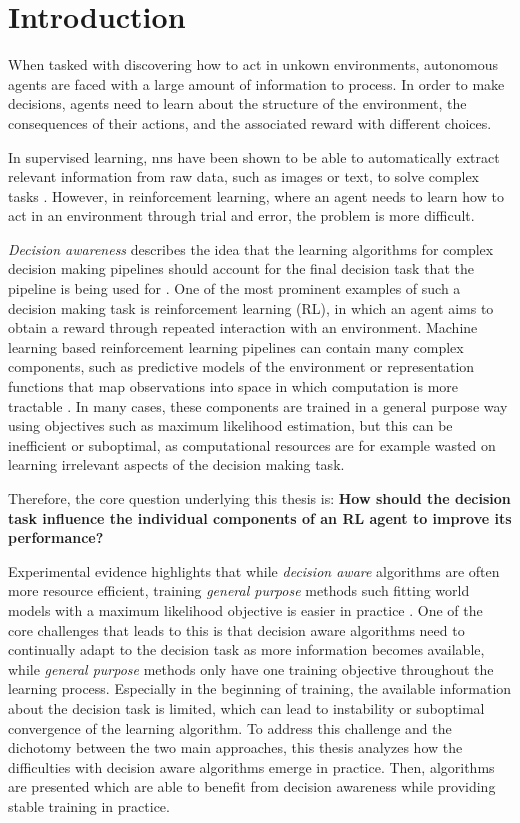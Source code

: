 \chapter{Introduction}

When tasked with discovering how to act in unkown environments, autonomous agents are faced with a large amount of information to process.
In order to make decisions, agents need to learn about the structure of the environment, the consequences of their actions, and the associated reward with different choices.

In supervised learning, \acp{nn} have been shown to be able to automatically extract relevant information from raw data, such as images or text, to solve complex tasks \parencite{lecun2015deep}.
However, in reinforcement learning, where an agent needs to learn how to act in an environment through trial and error, the problem is more difficult.


\emph{Decision awareness} describes the idea that the learning algorithms for complex decision making pipelines should account for the final decision task that the pipeline is being used for \parencite{vaml,grimm2020value,abachi2020policy,nikishin2021control}.
One of the most prominent examples of such a decision making task is reinforcement learning (RL), in which an agent aims to obtain a reward through repeated interaction with an environment.
Machine learning based reinforcement learning pipelines can contain many complex components, such as predictive models of the environment \parencite{dyna,mbpo,hafner2019learning,Hafner2020Dream,schrittwieser2020mastering} or representation functions that map observations into space in which computation is more tractable \parencite{ferns2004metrics,le2021metrics}.
In many cases, these components are trained in a general purpose way using objectives such as maximum likelihood estimation, but this can be inefficient or suboptimal, as computational resources are for example wasted on learning irrelevant aspects of the decision making task.

Therefore, the core question underlying this thesis is: \textbf{How should the decision task influence the individual components of an RL agent to improve its performance?}

Experimental evidence highlights that while \emph{decision aware} algorithms are often more resource efficient, training \emph{general purpose} methods such fitting world models with a maximum likelihood objective is easier in practice \parencite{vagram}.
One of the core challenges that leads to this is that decision aware algorithms need to continually adapt to the decision task as more information becomes available, while \emph{general purpose} methods only have one training objective throughout the learning process.
Especially in the beginning of training, the available information about the decision task is limited, which can lead to instability or suboptimal convergence of the learning algorithm.
To address this challenge and the dichotomy between the two main approaches, this thesis analyzes how the difficulties with decision aware algorithms emerge in practice.
Then, algorithms are presented which are able to benefit from decision awareness while providing stable training in practice.

